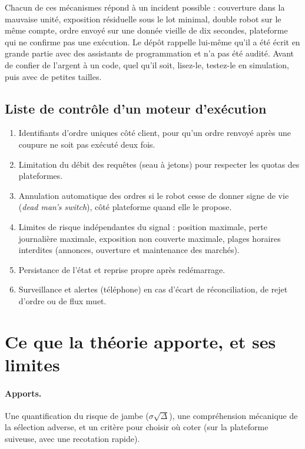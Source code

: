 \begin{pitfall}
Chacun de ces mécanismes répond à un incident possible : couverture dans la mauvaise unité, exposition résiduelle sous le lot minimal, double robot sur le même compte, ordre envoyé sur une donnée vieille de dix secondes, plateforme qui ne confirme pas une exécution. Le dépôt rappelle lui-même qu'il a été écrit en grande partie avec des assistants de programmation et n'a pas été audité. Avant de confier de l'argent à un code, quel qu'il soit, lisez-le, testez-le en simulation, puis avec de petites tailles.
\end{pitfall}

\subsection{Liste de contrôle d'un moteur d'exécution}

\begin{enumerate}
\item Identifiants d'ordre uniques côté client, pour qu'un ordre renvoyé après une coupure ne soit pas exécuté deux fois.
\item Limitation du débit des requêtes (seau à jetons) pour respecter les quotas des plateformes.
\item Annulation automatique des ordres si le robot cesse de donner signe de vie (\emph{dead man's switch}), côté plateforme quand elle le propose.
\item Limites de risque indépendantes du signal : position maximale, perte journalière maximale, exposition non couverte maximale, plages horaires interdites (annonces, ouverture et maintenance des marchés).
\item Persistance de l'état et reprise propre après redémarrage.
\item Surveillance et alertes (téléphone) en cas d'écart de réconciliation, de rejet d'ordre ou de flux muet.
\end{enumerate}

\section{Ce que la théorie apporte, et ses limites}

\paragraph{Apports.} Une quantification du risque de jambe ($\sigma\sqrt\Delta$), une compréhension mécanique de la sélection adverse, et un critère pour choisir où coter (sur la plateforme suiveuse, avec une recotation rapide).

